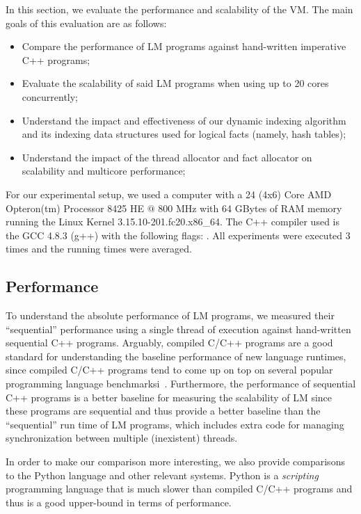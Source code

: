In this section, we evaluate the performance and scalability of the VM. The main
goals of this evaluation are as follows:

\begin{itemize}
   \item Compare the performance of LM programs against hand-written
      imperative C++ programs;
   \item Evaluate the scalability of said LM programs when using up to 20 cores
      concurrently;
   \item Understand the impact and effectiveness of our dynamic indexing
      algorithm and its indexing data structures used for logical facts (namely,
      hash tables);
   \item Understand the impact of the thread allocator and fact allocator on scalability and
      multicore performance;
\end{itemize}

For our experimental setup, we used a computer with a 24 (4x6) Core AMD
Opteron(tm) Processor 8425 HE $@$ 800 MHz with 64 GBytes of RAM memory running
the Linux Kernel 3.15.10-201.fc20.x86\_64. The C++ compiler used is the GCC
4.8.3 (g++) with the following  flags: .  All experiments were executed 3 times and the running times
were averaged.

\subsection{Performance}

To understand the absolute performance of LM programs, we measured their
``sequential'' performance using a single thread of execution against
hand-written sequential C++ programs. Arguably, compiled C/C++ programs are a
good standard for understanding the baseline performance of new language
runtimes, since compiled C/C++ programs tend to come up on top on several
popular programming language benchmarksi~\cite{language_benchmarks}.
Furthermore, the performance of sequential C++ programs is a better baseline for
measuring the scalability of LM since these programs are sequential and thus
provide a better baseline than the ``sequential'' run time of LM programs,
which includes extra code for managing synchronization between multiple
(inexistent) threads.

In order to make our comparison more interesting, we also provide comparisons to
the Python language and other relevant systems. Python is a \emph{scripting}
programming language that is much slower than compiled C/C++ programs and thus
is a good upper-bound in terms of performance.

